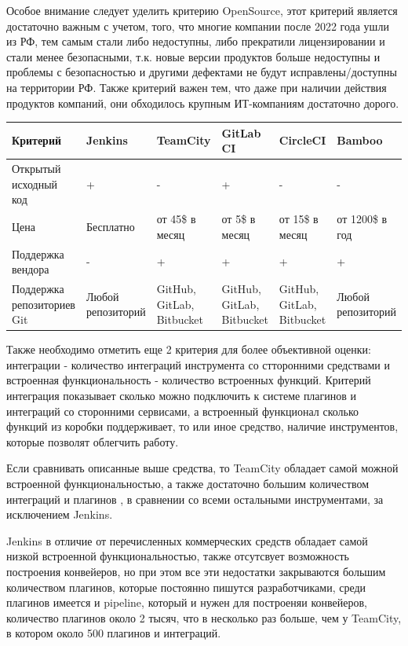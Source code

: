 Особое внимание следует уделить критерию OpenSource, этот критерий является достаточно важным с учетом, того, что многие компании после 2022 года ушли из РФ, тем самым стали либо недоступны, либо прекратили лицензировании и стали менее безопасными, т.к. новые версии продуктов больше недоступны и проблемы с безопасностью и другими дефектами не будут исправлены/доступны на территории РФ. Также критерий важен тем, что даже при наличии действия продуктов компаний, они обходилось крупным ИТ-компаниям достаточно дорого.

\begin{table}
    \centering
    \begin{tabular}{|p{3cm}|p{2cm}|p{2cm}|p{2cm}|p{2cm}|p{2cm}|}
    \hline
        Критерий & Jenkins & TeamCity & GitLab CI & CircleCI & Bamboo \\ \hline
        Открытый исходный код & + & - & + & - & - \\ \hline
        Цена & Бесплатно & от 45\$ в месяц & от 5\$ в месяц & от 15\$ в месяц & от 1200\$ в год \\ \hline
        Поддержка вендора & - & + & + &+ & + \\ \hline
        Поддержка репозиториев Git & Любой репозиторий & GitHub, GitLab, Bitbucket & GitHub, GitLab, Bitbucket  & GitHub, GitLab, Bitbucket & Любой репозиторий  \\ \hline

    \end{tabular}
\end{table}	

Также необходимо отметить еще 2 критерия для более объективной оценки: интеграции - количество интеграций инструмента со стторонними средствами и встроенная функциональность - количество встроенных функций.
Критерий интеграция показывает сколько можно подключить к системе плагинов и интеграций со сторонними сервисами, а встроенный функционал сколько функций из коробки поддерживает, то или иное средство, наличие инструментов, которые позволят облегчить работу.

Если сравнивать описанные выше средства, то TeamCity обладает самой можной встроенной функциональностью, а также достаточно большим количеством интеграций и плагинов \cite{cianalyze}, в сравнении со всеми остальными инструментами, за исключением Jenkins.

Jenkins в отличие от перечисленных коммерческих средств обладает самой низкой встроенной функциональностью, также отсутсвует возможность построения конвейеров, но при этом все эти недостатки закрываются большим количеством плагинов, которые постоянно пишутся разработчиками, среди плагинов имеется и pipeline, который и нужен для построеняи конвейеров, количество плагинов около 2 тысяч, что в несколько раз больше, чем у TeamCity, в котором около 500 плагинов и интеграций.

